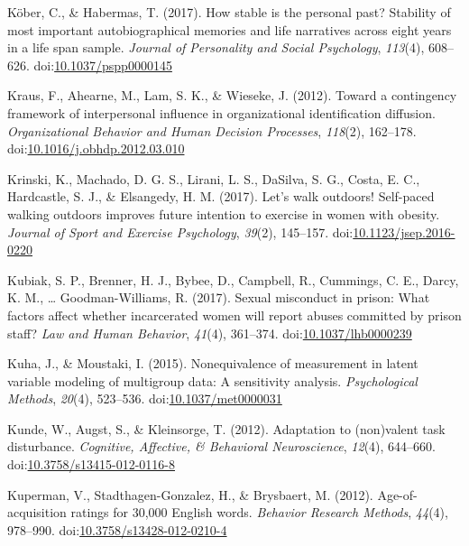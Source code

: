 \documentclass[english,man]{apa6}
\theoremstyle{definition}
\theoremstyle{definition}
\theoremstyle{definition}
\theoremstyle{remark}
\begin{document}
\hypertarget{ref-Kober2017}{}
Köber, C., \& Habermas, T. (2017). How stable is the personal past?
Stability of most important autobiographical memories and life
narratives across eight years in a life span sample. \emph{Journal of
Personality and Social Psychology}, \emph{113}(4), 608--626.
doi:\href{https://doi.org/10.1037/pspp0000145}{10.1037/pspp0000145}

\hypertarget{ref-Kraus2012}{}
Kraus, F., Ahearne, M., Lam, S. K., \& Wieseke, J. (2012). Toward a
contingency framework of interpersonal influence in organizational
identification diffusion. \emph{Organizational Behavior and Human
Decision Processes}, \emph{118}(2), 162--178.
doi:\href{https://doi.org/10.1016/j.obhdp.2012.03.010}{10.1016/j.obhdp.2012.03.010}

\hypertarget{ref-Krinski2017}{}
Krinski, K., Machado, D. G. S., Lirani, L. S., DaSilva, S. G., Costa, E.
C., Hardcastle, S. J., \& Elsangedy, H. M. (2017). Let's walk outdoors!
Self-paced walking outdoors improves future intention to exercise in
women with obesity. \emph{Journal of Sport and Exercise Psychology},
\emph{39}(2), 145--157.
doi:\href{https://doi.org/10.1123/jsep.2016-0220}{10.1123/jsep.2016-0220}

\hypertarget{ref-Kubiak2017}{}
Kubiak, S. P., Brenner, H. J., Bybee, D., Campbell, R., Cummings, C. E.,
Darcy, K. M., \ldots{} Goodman-Williams, R. (2017). Sexual misconduct in
prison: What factors affect whether incarcerated women will report
abuses committed by prison staff? \emph{Law and Human Behavior},
\emph{41}(4), 361--374.
doi:\href{https://doi.org/10.1037/lhb0000239}{10.1037/lhb0000239}

\hypertarget{ref-Kuha2015}{}
Kuha, J., \& Moustaki, I. (2015). Nonequivalence of measurement in
latent variable modeling of multigroup data: A sensitivity analysis.
\emph{Psychological Methods}, \emph{20}(4), 523--536.
doi:\href{https://doi.org/10.1037/met0000031}{10.1037/met0000031}

\hypertarget{ref-Kunde2012}{}
Kunde, W., Augst, S., \& Kleinsorge, T. (2012). Adaptation to
(non)valent task disturbance. \emph{Cognitive, Affective, \& Behavioral
Neuroscience}, \emph{12}(4), 644--660.
doi:\href{https://doi.org/10.3758/s13415-012-0116-8}{10.3758/s13415-012-0116-8}

\hypertarget{ref-Kuperman2012}{}
Kuperman, V., Stadthagen-Gonzalez, H., \& Brysbaert, M. (2012).
Age-of-acquisition ratings for 30,000 English words. \emph{Behavior
Research Methods}, \emph{44}(4), 978--990.
doi:\href{https://doi.org/10.3758/s13428-012-0210-4}{10.3758/s13428-012-0210-4}
\end{document}
